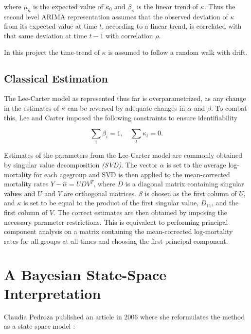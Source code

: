 \documentclass[
]{book}
\begin{document}
where \(\mu_\kappa\) is the expected value of \(\kappa_0\) and \(\beta_\kappa\) is the linear trend of \(\kappa\). Thus the second level ARIMA representation assumes that the observed deviation of \(\kappa\) from its expected value at time \(t\), according to a linear trend, is correlated with that same deviation at time \(t-1\) with correlation \(\rho\).

In this project the time-trend of \(\kappa\) is assumed to follow a random walk with drift.

\hypertarget{classical-estimation}{%
\subsection{Classical Estimation}\label{classical-estimation}}

The Lee-Carter model as represented thus far is overparametrized, as any change in the estimates of \(\kappa\) can be reversed by adequate changes in \(\alpha\) and \(\beta\). To combat this, Lee and Carter imposed the following constraints to ensure identifiability

\[
\sum_i\beta_i = 1, \quad \sum_t \kappa_t = 0.
\]

Estimates of the parameters from the Lee-Carter model are commonly obtained by singular value decomposition \emph{(SVD)}. The vector \(\alpha\) is set to the average log-mortality for each agegroup and SVD is then applied to the mean-corrected mortality rates \(Y - \hat\alpha = UDV^T\), where \(D\) is a diagonal matrix containing singular values and \(U\) and \(V\) are orthogonal matrices. \(\beta\) is chosen as the first column of \(U\), and \(\kappa\) is set to be equal to the product of the first singular value, \(D_{11}\), and the first column of \(V\). The correct estimates are then obtained by imposing the necessary parameter restrictions. This is equivalent to performing principal component analysis on a matrix containing the mean-corrected log-mortality rates for all groups at all times and choosing the first principal component.

\hypertarget{a-bayesian-state-space-interpretation}{%
\section{A Bayesian State-Space Interpretation}\label{a-bayesian-state-space-interpretation}}

Claudia Pedroza published an article in 2006 where she reformulates the method as a state-space model \citep{pedroza2006bayesian}:
\end{document}

